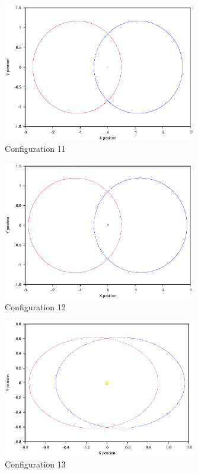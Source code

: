 \documentclass[a4paper,12pt]{article}
\begin{document}
\begin{figure}[H]
\centering
\includegraphics[width=0.75\textwidth]{./results/01-7-01-2/Orbit.eps}
\caption{Configuration 11}
\label{fig:config11}
\end{figure}
\begin{figure}[H]
\centering
\includegraphics[width=0.75\textwidth]{./results/02-75-02-1/Orbit.eps}
\caption{Configuration 12}
\label{fig:config12}
\end{figure}
\begin{figure}[H]
\centering
\includegraphics[width=0.75\textwidth]{./results/025-65-02/Orbit.eps}
\caption{Configuration 13}
\label{fig:config13}
\end{figure}
\end{document}
